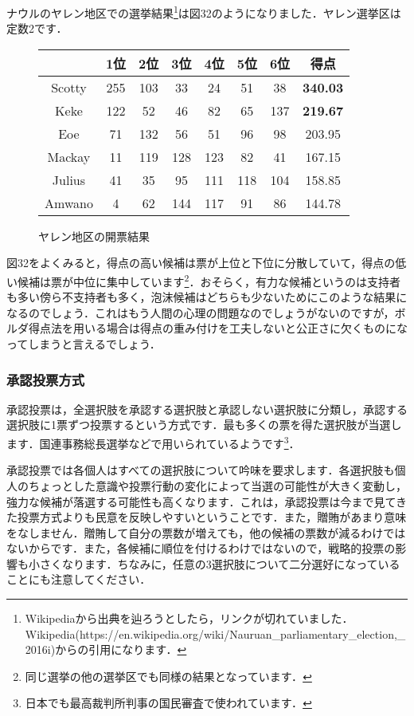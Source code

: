 ナウルのヤレン地区での選挙結果\footnote{Wikipediaから出典を辿ろうとしたら，リンクが切れていました．Wikipedia(https://en.wikipedia.org/wiki/Nauruan\_parliamentary\_election,\_2016i)からの引用になります．}は図32のようになりました．ヤレン選挙区は定数2です．

\begin{figure}[!h]
    \centering
    \begin{tabular}[!h]{|c|c|c|c|c|c|c|c|} \hline
         & 1位 & 2位 & 3位 & 4位 & 5位 & 6位 & 得点 \\ \hline
        Scotty & 255 & 103 &  33 &  24 &  51 &  38 & {\bf 340.03} \\ \hline
        Keke   & 122 &  52 &  46 &  82 &  65 & 137 & {\bf 219.67} \\ \hline
        Eoe    &  71 & 132 &  56 &  51 &  96 &  98 & 203.95 \\ \hline
        Mackay &  11 & 119 & 128 & 123 &  82 &  41 & 167.15 \\ \hline
        Julius &  41 &  35 &  95 & 111 & 118 & 104 & 158.85 \\ \hline
        Amwano &   4 &  62 & 144 & 117 &  91 &  86 & 144.78 \\ \hline
    \end{tabular}
    \caption{ヤレン地区の開票結果}
\end{figure}

図32をよくみると，得点の高い候補は票が上位と下位に分散していて，得点の低い候補は票が中位に集中しています\footnote{同じ選挙の他の選挙区でも同様の結果となっています．}．おそらく，有力な候補というのは支持者も多い傍ら不支持者も多く，泡沫候補はどちらも少ないためにこのような結果になるのでしょう．これはもう人間の心理の問題なのでしょうがないのですが，ボルダ得点法を用いる場合は得点の重み付けを工夫しないと公正さに欠くものになってしまうと言えるでしょう．

\subsubsection*{承認投票方式}
承認投票は，全選択肢を承認する選択肢と承認しない選択肢に分類し，承認する選択肢に1票ずつ投票するという方式です．最も多くの票を得た選択肢が当選します．国連事務総長選挙などで用いられているようです\footnote{日本でも最高裁判所判事の国民審査で使われています．}．

承認投票では各個人はすべての選択肢について吟味を要求します．各選択肢も個人のちょっとした意識や投票行動の変化によって当選の可能性が大きく変動し，強力な候補が落選する可能性も高くなります．これは，承認投票は今まで見てきた投票方式よりも民意を反映しやすいということです．また，贈賄があまり意味をなしません．贈賄して自分の票数が増えても，他の候補の票数が減るわけではないからです．また，各候補に順位を付けるわけではないので，戦略的投票の影響も小さくなります．ちなみに，任意の3選択肢について二分選好になっていることにも注意してください．

